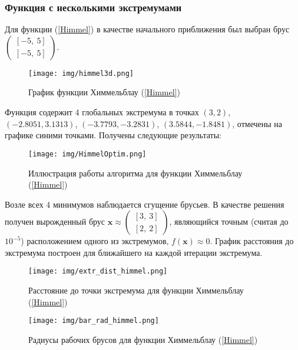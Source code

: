 \documentclass[a4paper]{article}
\begin{document}
\subsubsection{Функция с несколькими экстремумами}
Для функции (\ref{Himmel}) в качестве начального приближения был выбран брус $\begin{pmatrix}
[-5,\: 5]\\
[-5,\: 5]
\end{pmatrix}$.
\begin{figure}[H]
    \centering
    \texttt{[image: img/himmel3d.png]}
    \caption{График функции Химмельблау (\ref{Himmel})}
    \label{fig:himmel}
\end{figure}
Функция содержит 4 глобальных экстремума в точках $(3, 2)$, $(-2.8051, 3.1313)$, $(-3.7793, -3.2831)$, $(3.5844, -1.8481)$, отмечены на графике синими точками. Получены следующие результаты:
\begin{figure}[H]
    \centering
    \texttt{[image: img/HimmelOptim.png]}
    \caption{Иллюстрация работы алгоритма для функции Химмельблау (\ref{Himmel})}
    \label{fig:himOpt}
\end{figure}
Возле всех 4 минимумов наблюдается сгущение брусьев. В качестве решения получен вырожденный брус $\mathbf{x}\approx\begin{pmatrix}
[   3,\:    3]\\ 
[   2,\:   2]
\end{pmatrix}$, являющийся точным (считая до $10^{-5}$) расположением одного из экстремумов, $f(\mathbf{x})\approx0$. График расстояния до экстремума построен для ближайшего на каждой итерации экстремума.
\begin{figure}[H]
    \centering
    \texttt{[image: img/extr\_dist\_himmel.png]}
    \caption{Расстояние до точки экстремума для функции Химмельблау (\ref{Himmel})}
    \label{fig:himExtr}
\end{figure}
\begin{figure}[H]
    \centering
    \texttt{[image: img/bar\_rad\_himmel.png]}
    \caption{Радиусы рабочих брусов для функции Химмельблау (\ref{Himmel})}
    \label{fig:radHimmel}
\end{figure}
\end{document}
